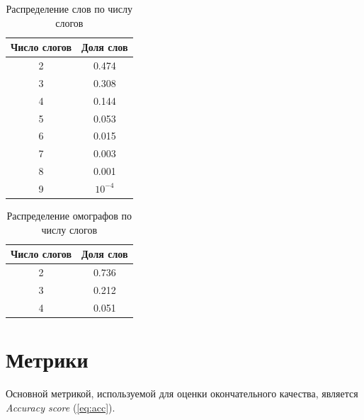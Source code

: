 \documentclass[14pt, a4paper, russian]{extreport}
\begin{document}
\begin{table}[H]
	\caption{Распределение слов по числу слогов}
	
	\begin{small}
		\begin{center}
			\begin{tabular}{|c|c|}
				\hline
				Число слогов & Доля слов \\ \hline
				     2       &   0.474   \\ \hline
				     3       &   0.308   \\ \hline
				     4       &   0.144   \\ \hline
				     5       &   0.053   \\ \hline
				     6       &   0.015   \\ \hline
				     7       &   0.003   \\ \hline
				     8       &   0.001   \\ \hline
				     9       & $10^{-4}$ \\ \hline
			\end{tabular}
			\end{center}
		\end{small}
	\label{table:length_gen}
\end{table}	
\begin{table}[H]
	\caption{Распределение омографов по числу слогов}
	
	\begin{small}
		\begin{center}
			\begin{tabular}{|c|c|}
				\hline
				Число слогов & Доля слов \\ \hline
				     2       &   0.736   \\ \hline
				     3       &   0.212   \\ \hline
				     4       &   0.051   \\ \hline
			\end{tabular}
		\end{center}
	\end{small}
	\label{table:length_homo}
\end{table}	



\section{Метрики}
Основной метрикой, используемой для оценки окончательного качества, является \textit{Accuracy score}  (\ref{eq:acc}). 
\end{document}
